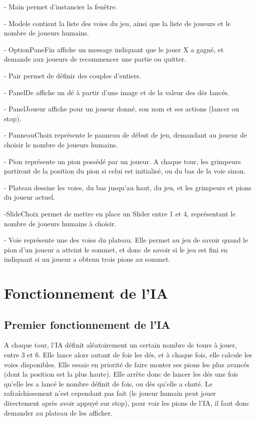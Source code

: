 \documentclass{report}
\begin{document}
- Main permet d'instancier la fenêtre.

- Modele contient la liste des voies du jeu, ainsi que la liste de joueurs et le nombre de joueurs humains.

- OptionPaneFin affiche un message indiquant que le jouer X a gagné, et demande aux joueurs de recommencer une partie ou quitter.

- Pair permet de définir des couples d'entiers.

- PanelDe affiche un dé à partir d'une image et de la valeur des dés lancés.

- PanelJoueur affiche pour un joueur donné, son nom et ses actions (lancer ou stop).

- PanneauChoix représente le panneau de début de jeu, demandant au joueur de choisir le nombre de joueurs humains.

- Pion représente un pion possédé par un joueur. A chaque tour, les grimpeurs partiront de la position du pion si celui est initialisé, ou du bas de la voie sinon.

- Plateau dessine les voies, du bas jusqu'au haut, du jeu, et les grimpeurs et pions du joueur actuel.

-SlideChoix permet de mettre en place un Slider entre 1 et 4, représentant le nombre de joueurs humains à choisir.

- Voie représente une des voies du plateau. Elle permet au jeu de savoir quand le pion d'un joueur a atteint le sommet, et donc de savoir si le jeu est fini en indiquant si un joueur a obtenu trois pions au sommet.

\chapter{Fonctionnement de l'IA}
\section{Premier fonctionnement de l'IA}
A chaque tour, l'IA définit aléatoirement un certain nombre de tours à jouer, entre 3 et 6. Elle lance alors autant de fois les dés, et à chaque fois, elle calcule les voies disponibles. Elle essaie en priorité de faire monter ses pions les plus avancés (dont la position est la plus haute). Elle arrête donc de lancer les dés une fois qu'elle les a lancé le nombre définit de fois, ou dès qu'elle a chuté.
Le rafraîchissement n'est cependant pas fait (le joueur humain peut jouer directement après avoir appuyé sur stop), pour voir les pions de l'IA, il faut donc demander au plateau de les afficher.
\end{document}
